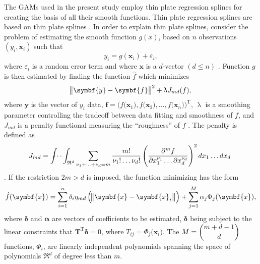 The GAMs used in the present study employ thin plate regression splines \parencite{Wood2003} for creating the basis of all their smooth functions.  Thin plate regression splines are based on thin plate splines \parencite{Duchon1977}.  In order to explain thin plate splines, consider the problem of estimating the smooth function \(g(x)\), based on \(n\) observations \((y_i, \symbf{x}_i)\) such that
\begin{equation}
  \label{eq:ThinPlateSplinesModel}
  y_i = g(\symbf{x}_i) + \varepsilon_i,
\end{equation}
where \(\varepsilon_i\) is a random error term and where \(\symbf{x}\) is a \(d\)-vector \((d \leq n)\) \parencite{Wood2006}.  Function \(g\) is then estimated by finding the function \(\hat{f}\) which minimizes
\begin{equation}
  \label{eq:ThinPlateSplinesTermToMinimize}
  \norm{\symbf{y} - \symbf{f}}^2 + \uplambda J_{md}(f),
\end{equation}
where \(\symbf{y}\) is the vector of \(y_i\) data, \(\symbf{f} = \bigl(f\bigl(\symbf{x}_1\bigr), f\bigl(\symbf{x}_2\bigr), \ldots, f\bigl(\symbf{x}_n\bigr)\bigr)^{\text{T}}\), \(\uplambda\) is a smoothing parameter controlling the tradeoff between data fitting and smoothness of \(f\), and \(J_{md}\) is a penalty functional measuring the ``roughness'' of \(f\) \parencite{Wood2006}.  The penalty is defined as
\begin{equation}
  \label{eq:ThinPlateSplinesPenalty}
  J_{md} = \int{\hspace{-3mm}}\cdots\int_{\mathfrak{R}^d} \sum_{\nu_1 + \ldots + \nu_d = m}\frac{m!}{\nu_1! \ldots \nu_d!} \left(\frac{\partial^mf}{\partial x_1^{\nu_1} \ldots \partial x_d^{\nu_d}}\right)^2 dx_1 \ldots dx_d~
\end{equation}
\parencite{Wood2006}.  If the restriction \(2m > d\) is imposed, the function minimizing  has the form
\begin{equation}
  \label{eq:ThinPlateSplinesMinimizingFunctionForm}
  \hat{f}(\symbf{x}) = \sum_{i = 1}^n \delta_i\eta_{md}\left(\norm{\symbf{x} - \symbf{x}_i}\right) + \sum_{j = 1}^M\alpha_j\Phi_j(\symbf{x}),
\end{equation}
where \(\symbf{\delta}\) and \(\symbf{\alpha}\) are vectors of coefficients to be estimated, \(\symbf{\delta}\) being subject to the linear constraints that \(\symbf{T}^{\text{T}}\symbf{\delta} = 0\), where \(T_{ij} = \Phi_j\bigl(\symbf{x}_i\bigr)\).
The \(M = \dbinom{m + d - 1}{d}\) functions, \(\Phi_i\), are linearly independent polynomials spanning the space of polynomials \(\mathfrak{R}^d\) of degree less than \(m\).  %
